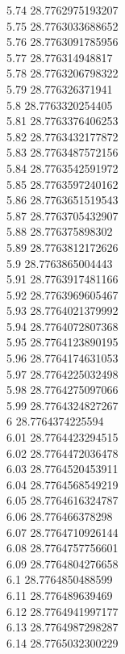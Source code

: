 {5.74	28.7762975193207\\
5.75	28.7763033688652\\
5.76	28.7763091785956\\
5.77	28.776314948817\\
5.78	28.7763206798322\\
5.79	28.776326371941\\
5.8	28.7763320254405\\
5.81	28.7763376406253\\
5.82	28.7763432177872\\
5.83	28.7763487572156\\
5.84	28.7763542591972\\
5.85	28.7763597240162\\
5.86	28.7763651519543\\
5.87	28.7763705432907\\
5.88	28.776375898302\\
5.89	28.7763812172626\\
5.9	28.7763865004443\\
5.91	28.7763917481166\\
5.92	28.7763969605467\\
5.93	28.7764021379992\\
5.94	28.7764072807368\\
5.95	28.7764123890195\\
5.96	28.7764174631053\\
5.97	28.7764225032498\\
5.98	28.7764275097066\\
5.99	28.7764324827267\\
6	28.7764374225594\\
6.01	28.7764423294515\\
6.02	28.7764472036478\\
6.03	28.7764520453911\\
6.04	28.7764568549219\\
6.05	28.7764616324787\\
6.06	28.776466378298\\
6.07	28.7764710926144\\
6.08	28.7764757756601\\
6.09	28.7764804276658\\
6.1	28.7764850488599\\
6.11	28.776489639469\\
6.12	28.7764941997177\\
6.13	28.7764987298287\\
6.14	28.7765032300229\\
}

